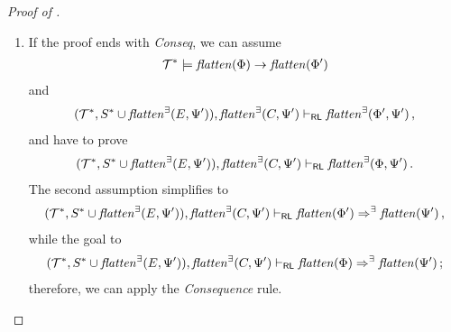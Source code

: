 \begin{proof}[Proof of ]
\begin{enumerate}
    \item If the proof ends with \emph{Conseq}, we can assume
    \begin{align*}
        \mathcal{T}^* \models \mathit{flatten}(\Phi) \rightarrow \mathit{flatten}(\Phi^\prime)
    \end{align*}
    and
    \begin{align*}
        (\mathcal{T}^*, S^* \cup \mathit{flatten}^\exists(E, \Psi^\prime)), \mathit{flatten}^\exists(C, \Psi^\prime) \vdash_{\mathsf{RL}}
          \mathit{flatten}^\exists(\Phi^\prime, \Psi^\prime) \, ,
    \end{align*}
    and have to prove
    \begin{align*}
        (\mathcal{T}^*, S^* \cup \mathit{flatten}^\exists(E, \Psi^\prime)), \mathit{flatten}^\exists(C, \Psi^\prime) \vdash_{\mathsf{RL}}
          \mathit{flatten}^\exists(\Phi, \Psi^\prime)  \, .
    \end{align*}
    The second assumption simplifies to
    \begin{align*}
        (\mathcal{T}^*, S^* \cup \mathit{flatten}^\exists(E, \Psi^\prime)), \mathit{flatten}^\exists(C, \Psi^\prime) \vdash_{\mathsf{RL}}
          \mathit{flatten}(\Phi^\prime) \Rightarrow^\exists \mathit{flatten}(\Psi^\prime) \, ,
    \end{align*}
    while the goal to
    \begin{align*}
        (\mathcal{T}^*, S^* \cup \mathit{flatten}^\exists(E, \Psi^\prime)), \mathit{flatten}^\exists(C, \Psi^\prime) \vdash_{\mathsf{RL}}
          \mathit{flatten}(\Phi) \Rightarrow^\exists \mathit{flatten}(\Psi^\prime) \, ;
    \end{align*}
    therefore, we can apply the \emph{Consequence} rule.        
        

\end{enumerate}
\end{proof}
